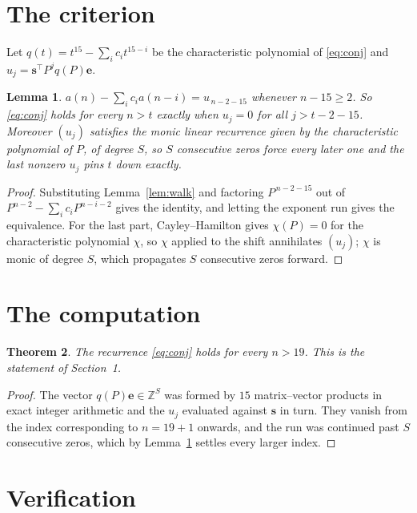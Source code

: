 \documentclass[11pt,a4paper]{article}
\theoremstyle{plain}
\newtheorem{theorem}{Theorem}
\newtheorem{lemma}[theorem]{Lemma}
\theoremstyle{definition}
\begin{document}
\section{The criterion}

Let $q(t)=t^{15}-\sum_i c_i t^{15-i}$ be the characteristic polynomial of
\eqref{eq:conj} and $u_j=\mathbf{s}^{\!\top}P^{j}q(P)\mathbf{e}$.

\begin{lemma}\label{lem:crit}
$a(n)-\sum_i c_i a(n-i)=u_{\,n-2-15}$ whenever $n-15\ge2$. So \eqref{eq:conj}
holds for every $n>t$ exactly when $u_j=0$ for all $j>t-2-15$. Moreover $(u_j)$
satisfies the monic linear recurrence given by the characteristic polynomial of $P$, of
degree $S$, so $S$ consecutive zeros force every later one and the last nonzero $u_j$ pins
$t$ down exactly.
\end{lemma}

\begin{proof}
Substituting Lemma~\ref{lem:walk} and factoring $P^{\,n-2-15}$ out of
$P^{n-2}-\sum_i c_i P^{n-i-2}$ gives the identity, and letting the exponent run gives the
equivalence. For the last part, Cayley--Hamilton gives $\chi(P)=0$ for the characteristic
polynomial $\chi$, so $\chi$ applied to the shift annihilates $(u_j)$; $\chi$ is monic of
degree $S$, which propagates $S$ consecutive zeros forward.
\end{proof}

\section{The computation}

\begin{theorem}
The recurrence \eqref{eq:conj} holds for every $n>19$. This is the statement of
Section~1.
\end{theorem}

\begin{proof}
The vector $q(P)\mathbf{e}\in\mathbb{Z}^{S}$ was formed by $15$ matrix--vector
products in exact integer arithmetic and the $u_j$ evaluated against $\mathbf{s}$ in turn.
They vanish from the index corresponding to $n=19+1$ onwards, and the run was continued
past $S$ consecutive zeros, which by Lemma~\ref{lem:crit} settles every larger index.
\end{proof}

\section{Verification}
\end{document}

